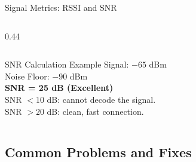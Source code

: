 \documentclass[aspectratio=169]{beamer}
\begin{document}
\begin{frame}{Signal Metrics: RSSI and SNR}
\begin{columns}[T]
\begin{column}{0.44\textwidth}
\begin{table}[]
{\begin{tabular}{|l|l|}
                \end{tabular}
                }
            \end{table}
            \vspace{0.2em}
            \begin{exampleblock}{SNR Calculation Example}
                \scriptsize
                Signal: $-65$ dBm\\
                Noise Floor: $-90$ dBm\\
                \textbf{SNR = 25 dB (Excellent)}\\[0.3em]
                SNR $< 10$ dB: cannot decode the signal.\\
                SNR $> 20$ dB: clean, fast connection.
            \end{exampleblock}
        \end{column}
    \end{columns}
\end{frame}

\subsection{Common Problems and Fixes}
\end{document}

